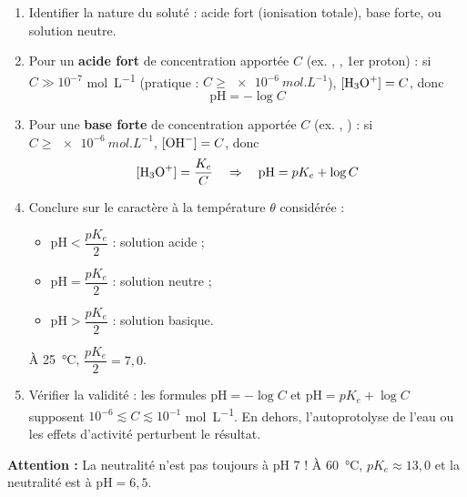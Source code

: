 \documentclass[11pt]{article}
\newcommand{\cle}[1]{{\popxbold\color{popdark}#1}}
\begin{document}
\begin{methode}
\begin{enumerate}
\item Identifier la nature du soluté : acide fort (ionisation totale), base forte, ou solution neutre.
\item Pour un \textbf{acide fort} de concentration apportée $C$ (ex. , ,  1er proton) : si $C \gg 10^{-7}$ \si{mol.L^{-1}} (pratique : $C \geq \SI{e-6}{mol.L^{-1}}$), $[\ce{H3O+}] = C$, donc \[ \mathrm{pH} = -\log C \]
\item Pour une \textbf{base forte} de concentration apportée $C$ (ex. , ) : si $C \geq \SI{e-6}{mol.L^{-1}}$, $[\ce{OH-}] = C$, donc \[ [\ce{H3O+}] = \frac{K_e}{C} \quad \Rightarrow \quad \mathrm{pH} = pK_e + \log C \]
\item Conclure sur le caractère à la température $\theta$ considérée :
\begin{itemize}
\item $\mathrm{pH} < \dfrac{pK_e}{2}$ : solution \cle{acide} ;
\item $\mathrm{pH} = \dfrac{pK_e}{2}$ : solution \cle{neutre} ;
\item $\mathrm{pH} > \dfrac{pK_e}{2}$ : solution \cle{basique}.
\end{itemize}
À \SI{25}{\celsius}, $\dfrac{pK_e}{2} = 7{,}0$.
\item Vérifier la validité : les formules $\mathrm{pH} = -\log C$ et $\mathrm{pH} = pK_e + \log C$ supposent $10^{-6} \lesssim C \lesssim 10^{-1}$ \si{mol.L^{-1}}. En dehors, l'autoprotolyse de l'eau ou les effets d'activité perturbent le résultat.
\end{enumerate}
\textbf{Attention :} La neutralité n'est pas toujours à pH 7 ! À \SI{60}{\celsius}, $pK_e \approx 13{,}0$ et la neutralité est à $\mathrm{pH} = 6{,}5$.
\end{methode}
\end{document}
